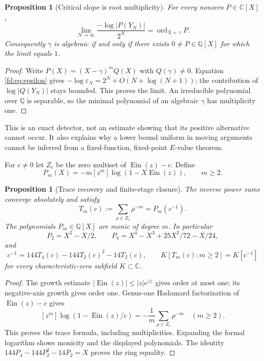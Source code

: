 \documentclass[11pt,a4paper]{article}
\newcommand{\Q}{\mathbb Q}
\newcommand{\C}{\mathbb C}
\newcommand{\Ein}{\operatorname{Ein}}
\newtheorem{proposition}[theorem]{Proposition}
\theoremstyle{definition}
\theoremstyle{remark}
\numberwithin{equation}{section}
\begin{document}
\begin{proposition}[Critical slope is root multiplicity]\label{fd:prop:slope}
For every nonzero $P\in\C[X]$,
\begin{equation}\label{fd:eq:slope}
 \lim_{N\to\infty}\frac{-\log|P(Y_N)|}{2^N}
 =\operatorname{ord}_{X=\gamma}P.
\end{equation}
Consequently $\gamma$ is algebraic if and only if there exists
$0\ne P\in\Q[X]$ for which the limit equals $1$.
\end{proposition}
\begin{proof}
Write $P(X)=(X-\gamma)^mQ(X)$ with $Q(\gamma)\ne0$.  Equation
\eqref{fd:eq:epsilon} gives $-\log\varepsilon_N=2^N+O(N+\log(N+1))$;
the contribution of $\log|Q(Y_N)|$ stays bounded.  This proves the limit.
An irreducible polynomial over $\Q$ is separable, so the minimal
polynomial of an algebraic $\gamma$ has multiplicity one.
\end{proof}

This is an exact detector, not an estimate showing that its positive
alternative cannot occur.  It also explains why a lower bound uniform in
moving arguments cannot be inferred from a fixed-function, fixed-point
$E$-value theorem.

For $c\ne0$ let $Z_c$ be the zero multiset of $\Ein(z)-c$.  Define
\[
 P_m(X)=-m[z^m]\log(1-X\Ein(z)),\qquad m\ge2.
\]

\begin{proposition}[Trace recovery and finite-stage closure]\label{fd:prop:trace}
The inverse power sums converge absolutely and satisfy
\[
 T_m(c):=\sum_{\rho\in Z_c}\rho^{-m}=P_m(c^{-1}).
\]
The polynomials $P_m\in\Q[X]$ are monic of degree $m$.  In particular
\[
 P_2=X^2-X/2,\qquad
 P_4=X^4-X^3+25X^2/72-X/24,
\]
and
\begin{equation}\label{fd:eq:traceclosure}
 c^{-1}=144T_4(c)-144T_2(c)^2-14T_2(c),\qquad
 K[T_m(c):m\ge2]=K[c^{-1}]
\end{equation}
for every characteristic-zero subfield $K\subset\C$.
\end{proposition}
\begin{proof}
The growth estimate $|\Ein(z)|\le |z|e^{|z|}$ gives order at most one;
its negative-axis growth gives order one.  Genus-one Hadamard
factorization of $\Ein(z)-c$ gives
\[
 [z^m]\log(1-\Ein(z)/c)=-\frac1m\sum_{\rho\in Z_c}\rho^{-m}
 \quad(m\ge2).
\]
This proves the trace formula, including multiplicities.  Expanding the
formal logarithm shows monicity and the displayed polynomials.
The identity $144P_4-144P_2^2-14P_2=X$ proves the ring equality.
\end{proof}
\end{document}
